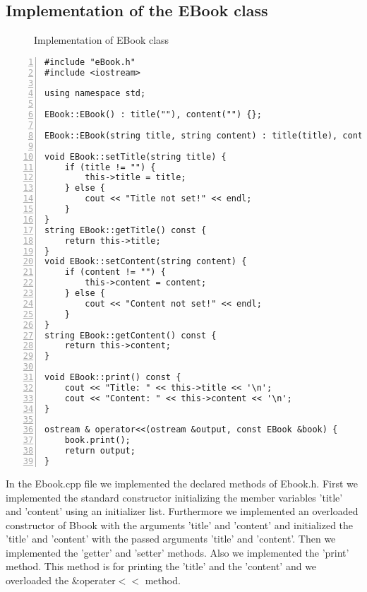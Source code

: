 \documentclass{article}
\begin{document}
\subsection{Implementation of the EBook class}
\begin{figure}
\scriptsize{\caption{Implementation of EBook class}}
\end{figure}
\begin{lstlisting}[basicstyle=\footnotesize\ttfamily, numbers=left, stepnumber=1, numberstyle = \normalsize]
#include "eBook.h"
#include <iostream>

using namespace std;

EBook::EBook() : title(""), content("") {};

EBook::EBook(string title, string content) : title(title), content(content) {};

void EBook::setTitle(string title) {
	if (title != "") {
		this->title = title;
	} else {
		cout << "Title not set!" << endl;
	}
}
string EBook::getTitle() const {
	return this->title;
}
void EBook::setContent(string content) {
	if (content != "") {
		this->content = content;
	} else {
		cout << "Content not set!" << endl;
	}
}
string EBook::getContent() const {
	return this->content;
}

void EBook::print() const {
	cout << "Title: " << this->title << '\n';
	cout << "Content: " << this->content << '\n';
}

ostream & operator<<(ostream &output, const EBook &book) {
	book.print();
	return output;
}
\end{lstlisting}
\normalsize{In the Ebook.cpp file we implemented the declared methods of Ebook.h.
First we implemented the standard constructor initializing the member variables 'title' and 'content' using an initializer list. 
Furthermore we implemented an overloaded constructor of Bbook with the arguments 'title' and 'content' and initialized the 'title' and 'content' with the passed arguments 'title' and 'content'.
Then we implemented the 'getter' and 'setter' methods.
Also we implemented the 'print' method. This method is for printing the 'title' and the 'content' and we overloaded the \&operater$<<$ method.}




\end{document}
